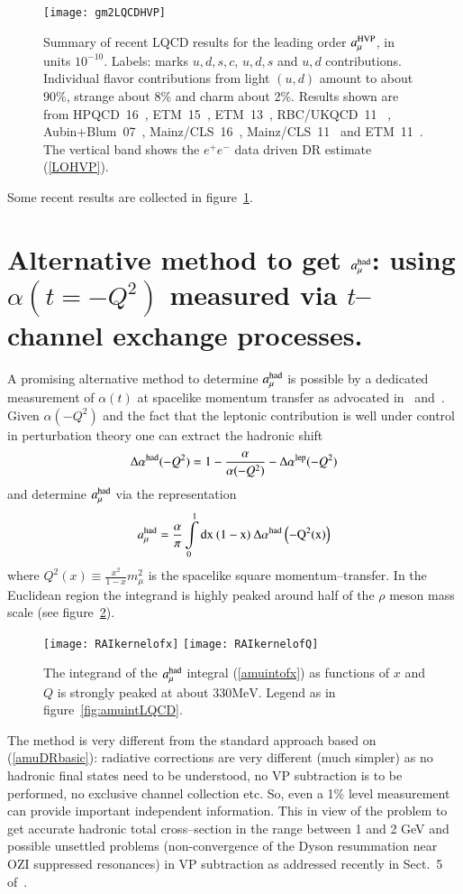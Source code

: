 \documentclass[epj,onecolumn]{webofc}
\newcommand{\dalh}{\Delta \alpha^{\rm had}}
\newcommand{\mv}{\mbox{MeV}}
\newcommand{\mbo}[1]{$#1$ }
\newcommand{\epm}{e^+e^- }
\newcommand{\D}{\rm d }
\newcommand{\amuh}{a_\mu^{\rm had} }
\newcommand{\bea}{\begin{eqnarray}}
\newcommand{\eea}{\end{eqnarray}}
\begin{document}
\begin{figure}[h]
\vspace*{-6mm}
\centering
\texttt{[image: gm2LQCDHVP]}
\caption{Summary of recent LQCD results for the leading order
$a_\mu^{\rm HVP}$, in units $10^{-10}$. Labels:  marks
$u,d,s,c$,  $u,d,s$ and  $u,d$
contributions. Individual flavor  contributions from light $(u,d)$
amount to about 90\%, strange about 8\% and charm about 2\%. Results
shown are from  HPQCD~16~\cite{Chakraborty:2016mwy}, ETM~15~\cite{Burger:2015hdi},
ETM~13~\cite{Burger:2013jya}, RBC/UKQCD~11 ~\cite{Boyle:2011hu},
Aubin+Blum~07~\cite{Aubin:2006xv}, Mainz/CLS~16~\cite{DellaMorte:2016izp},
Mainz/CLS~11~\cite{DellaMorte:2011aa} and
ETM~11~\cite{Feng:2011zk}. The vertical band shows the $\epm$ data
driven DR estimate (\ref{LOHVP}).}
\label{fig:gm2LQCDHVP}
\end{figure}
Some recent results are collected in figure~\ref{fig:gm2LQCDHVP}.
\section{Alternative method to get $\amuh$: using $\alpha(t=-Q^2)$
measured via $t$--channel exchange processes.}
\label{sec-6}
A promising alternative method to determine $\amuh$ is possible by a
dedicated measurement of $\alpha(t)$ at spacelike
momentum transfer as advocated in~\cite{Calame:2015fva}
and~\cite{Abbiendi:2016xup}. Given $\alpha(-Q^2)$ and the fact that
the leptonic contribution is well under control in perturbation theory
one can extract the hadronic shift
\bea
\dalh(-Q^2)=1-\frac{\alpha}{\alpha(-Q^2)}-{\Delta \alpha^{\rm lep}(-Q^2)}
\eea
and determine \mbo{\amuh} via the representation
\bea
\amuh=\frac{\alpha}{\pi}\int\limits_0^1 \D x\:(1-x)\: \dalh
\left(-Q^2(x)\right)
\label{amuintofx}
\eea
where $ Q^2(x)\equiv \frac{x^2}{1-x}m_\mu^2$ is the spacelike
square momentum--transfer. In the Euclidean region the integrand is highly peaked
around half of the $\rho$ meson mass scale (see figure~\ref{fig:RAIkernels}).
\begin{figure}[h]
\vspace*{-9mm}
\centering
\texttt{[image: RAIkernelofx]}
\texttt{[image: RAIkernelofQ]}
\caption{The integrand of the \mbo{\amuh} integral (\ref{amuintofx})
as functions of $x$ and $Q$ is strongly
peaked at about $ 330\mv$. Legend as in figure~\ref{fig:amuintLQCD}.}
\label{fig:RAIkernels}
\end{figure}
The method is very different from the standard approach based on
(\ref{amuDRbasic}): radiative corrections are very different (much
simpler) as no hadronic final states need to be understood, no VP
subtraction is to be performed, no exclusive channel collection etc.
So, even a 1\% level measurement can provide important independent
information. This in view of the problem to get accurate hadronic
total cross--section in the range between 1 and 2 GeV and possible
unsettled problems (non-convergence of the Dyson resummation near OZI
suppressed resonances) in VP subtraction as addressed recently in
Sect.~5 of~\cite{Jegerlehner:2015stw}.
\end{document}
